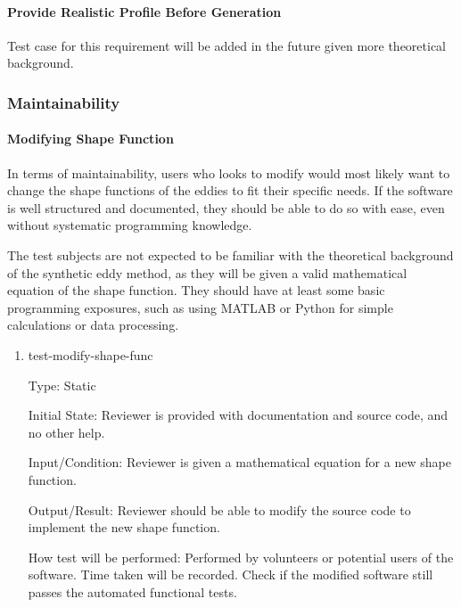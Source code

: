 \documentclass[12pt, titlepage]{article}
\begin{document}
\paragraph{Provide Realistic Profile Before Generation \\}
Test case for this requirement will be added in the future given more theoretical background.

\subsubsection{Maintainability} \label{ST:Maint}
		
\paragraph{Modifying Shape Function\\}
In terms of maintainability, users who looks to modify \progname{} would most likely want to change the shape functions of the eddies to fit their specific needs. If the software is well structured and documented, they should be able to do so with ease, even without systematic programming knowledge.

The test subjects are not expected to be familiar with the theoretical background of the synthetic eddy method, as they will be given a valid mathematical equation of the shape function. They should have at least some basic programming exposures, such as using MATLAB or Python for simple calculations or data processing.

\begin{enumerate}

\item{test-modify-shape-func\\}

Type: Static
					
Initial State: Reviewer is provided with documentation and source code, and no other help.
					
Input/Condition: Reviewer is given a mathematical equation for a new shape function.
					
Output/Result: Reviewer should be able to modify the source code to implement the new shape function.
					
How test will be performed: Performed by volunteers or potential users of the software. Time taken will be recorded. Check if the modified software still passes the automated functional tests.

\end{enumerate}
\end{document}
